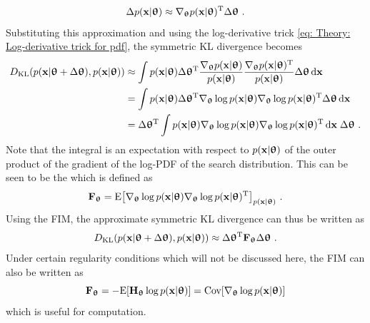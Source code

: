 \begin{equation}
    \Delta p(\x|\thetab) \approx \nabla_\thetab p(\x|\thetab)\transpose\Delta\thetab \ .
\end{equation}
Substituting this approximation and using the log-derivative trick \eqref{eq: Theory: Log-derivative trick for pdf}, the symmetric \gls{KL} divergence becomes
\begin{align}
    D_\text{KL}(p(\x|\thetab+\Delta\thetab),p(\x|\thetab))
    &\approx \int p(\x|\thetab)
    \Delta\thetab\transpose\frac{\nabla_\thetab p(\x|\thetab)}{p(\x|\thetab)}
    \frac{\nabla_\thetab p(\x|\thetab)\transpose}{p(\x|\thetab)}\Delta\thetab\,\text{d}\x\nonumber\\
    &= \int p(\x|\thetab)
    \Delta\thetab\transpose\nabla_\thetab\log p(\x|\thetab)
    \nabla_\thetab\log p(\x|\thetab)\transpose\Delta\thetab\,\text{d}\x\nonumber\\
    &= \Delta\thetab\transpose\int p(\x|\thetab)
    \nabla_\thetab\log p(\x|\thetab)
    \nabla_\thetab\log p(\x|\thetab)\transpose\,\text{d}\x\; \Delta\thetab \ .
\end{align}
Note that the integral is an expectation with respect to $p(\x|\thetab)$ of the outer product of the gradient of the log-\gls{PDF} of the search distribution. This can be seen to be the  which is defined as \cite{Bishop2006}
\begin{equation}\label{eq: Theory: Fischer information matrix definition}
    \F_\thetab
    = \text{E}\bra{\nabla_\thetab\log p(\x|\thetab)\nabla_\thetab\log p(\x|\thetab)\transpose}_{p(\x|\thetab)} \ .
\end{equation}
Using the \gls{FIM}, the approximate symmetric \gls{KL} divergence can thus be written as
\begin{equation}\label{eq: Theory: Second order approximation to the symmetric KL divergence}
    D_\text{KL}(p(\x|\thetab+\Delta\thetab),p(\x|\thetab)) \approx \Delta\thetab\transpose\F_\thetab\Delta\thetab \ .
\end{equation}
Under certain regularity conditions which will not be discussed here, the \gls{FIM} can also be written as \cite{Ly2017}
\begin{equation}\label{eq: Theory: Fischer information matrix definition (for computation)}
    \F_\thetab = - \text{E}\bra{\H_\thetab\log p(\x|\thetab)} = \text{Cov}\bra{\nabla_\thetab\log p(\x|\thetab)}
\end{equation}
which is useful for computation.


